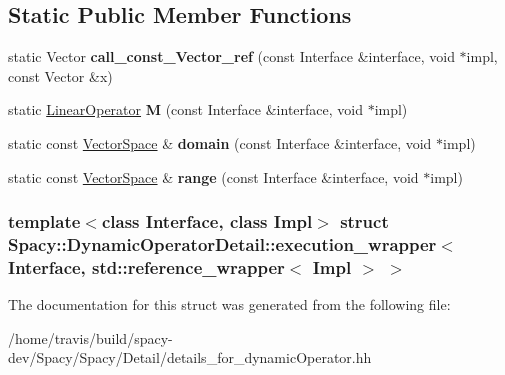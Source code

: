 \subsection*{\-Static \-Public \-Member \-Functions}
\begin{DoxyCompactItemize}
\item 
\hypertarget{structSpacy_1_1DynamicOperatorDetail_1_1execution__wrapper_3_01Interface_00_01std_1_1reference__wrapper_3_01Impl_01_4_01_4_a0397c1b3a237328f9b001bf0e9883a62}{static \-Vector {\bfseries call\-\_\-const\-\_\-\-Vector\-\_\-ref} (const \-Interface \&interface, void $\ast$impl, const \-Vector \&x)}\label{structSpacy_1_1DynamicOperatorDetail_1_1execution__wrapper_3_01Interface_00_01std_1_1reference__wrapper_3_01Impl_01_4_01_4_a0397c1b3a237328f9b001bf0e9883a62}

\item 
\hypertarget{structSpacy_1_1DynamicOperatorDetail_1_1execution__wrapper_3_01Interface_00_01std_1_1reference__wrapper_3_01Impl_01_4_01_4_af1b123f9f0405829ce03b7cc5af49f42}{static \hyperlink{classSpacy_1_1LinearOperator}{\-Linear\-Operator} {\bfseries \-M} (const \-Interface \&interface, void $\ast$impl)}\label{structSpacy_1_1DynamicOperatorDetail_1_1execution__wrapper_3_01Interface_00_01std_1_1reference__wrapper_3_01Impl_01_4_01_4_af1b123f9f0405829ce03b7cc5af49f42}

\item 
\hypertarget{structSpacy_1_1DynamicOperatorDetail_1_1execution__wrapper_3_01Interface_00_01std_1_1reference__wrapper_3_01Impl_01_4_01_4_a387db443c70c78151f8a8c3e4ef0aa2e}{static const \hyperlink{classSpacy_1_1VectorSpace}{\-Vector\-Space} \& {\bfseries domain} (const \-Interface \&interface, void $\ast$impl)}\label{structSpacy_1_1DynamicOperatorDetail_1_1execution__wrapper_3_01Interface_00_01std_1_1reference__wrapper_3_01Impl_01_4_01_4_a387db443c70c78151f8a8c3e4ef0aa2e}

\item 
\hypertarget{structSpacy_1_1DynamicOperatorDetail_1_1execution__wrapper_3_01Interface_00_01std_1_1reference__wrapper_3_01Impl_01_4_01_4_af1f459d4ade6993b1abc2887cbc57292}{static const \hyperlink{classSpacy_1_1VectorSpace}{\-Vector\-Space} \& {\bfseries range} (const \-Interface \&interface, void $\ast$impl)}\label{structSpacy_1_1DynamicOperatorDetail_1_1execution__wrapper_3_01Interface_00_01std_1_1reference__wrapper_3_01Impl_01_4_01_4_af1f459d4ade6993b1abc2887cbc57292}

\end{DoxyCompactItemize}
\subsubsection*{template$<$class Interface, class Impl$>$ struct Spacy\-::\-Dynamic\-Operator\-Detail\-::execution\-\_\-wrapper$<$ Interface, std\-::reference\-\_\-wrapper$<$ Impl $>$ $>$}



\-The documentation for this struct was generated from the following file\-:\begin{DoxyCompactItemize}
\item 
/home/travis/build/spacy-\/dev/\-Spacy/\-Spacy/\-Detail/details\-\_\-for\-\_\-dynamic\-Operator.\-hh\end{DoxyCompactItemize}
